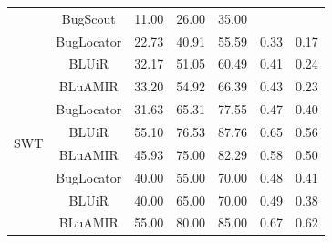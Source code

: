 \documentclass[conference]{IEEEtran}
\begin{document}
\begin{table}[htbp]
{\begin{tabular}{c|c|c|c|c|c|c}
			& BugScout & 11.00 & 26.00 & 35.00 &  &  \\  \cline{2-7}
			& BugLocator & 22.73 & 40.91 & 55.59 & 0.33 & 0.17 \\  \cline{2-7} 
			& BLUiR & 32.17 & 51.05 & 60.49 & 0.41 & 0.24 \\  \cline{2-7}
			 &BLuAMIR                                                                     & 33.20                                               & 54.92                                              & 66.39                                             &   0.43  &   0.23  \\ \hline \hline
			\multirow{4}{*}{SWT}                                       
			                                 
			       & BugLocator & 31.63 & 65.31 & 77.55 & 0.47 & 0.40 \\  \cline{2-7} 
			       & BLUiR & 55.10 & 76.53 & 87.76 & 0.65  & 0.56 \\  \cline{2-7} &BLuAMIR                                                                     & 45.93                                               & 75.00                                              & 82.29                                             &   0.58  &   0.50  \\ \hline \hline
			\multirow{4}{*}{Zxing}                  
			
			
			 & BugLocator & 40.00 & 55.00 & 70.00 & 0.48 & 0.41 \\  \cline{2-7}  
			 & BLUiR & 40.00 & 65.00 & 70.00 & 0.49  & 0.38 \\  \cline{2-7}
			  &BLuAMIR                                                                  & 55.00                                            & 80.00                                           & 85.00                                             &   0.67  &  0.62   \\ \hline
			
			
			
			
	\end{tabular}}
	\centering
\end{table}

\end{document}
